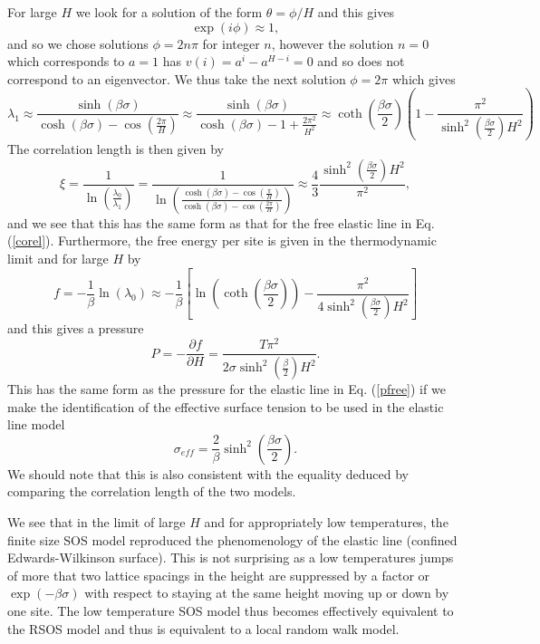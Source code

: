 For large $H$ we look for a solution of the form $\theta=\phi/H$ and this gives
\begin{equation}
\exp(i\phi) \approx  1,
\end{equation}
and so we chose solutions $\phi = 2n\pi$ for integer $n$, however the solution $n=0$ which corresponds to $a=1$ has $v(i) = a^i-a^{H-i} =0$ and so does not correspond to an eigenvector. We thus take the next solution $\phi = 2\pi$ which gives
\begin{equation}
\lambda_1 \approx \frac{\sinh(\beta\sigma)}{\cosh(\beta\sigma) - \cos(\frac{2\pi}{H})} \approx \frac{\sinh(\beta\sigma)}{\cosh(\beta\sigma) - 1+ \frac{2\pi^2}{H^2}}\approx \coth(\frac{\beta\sigma}{2})(1 - \frac{\pi^2}{\sinh^2(\frac{\beta\sigma}{2}) H^2})
\end{equation}
The correlation length is then given by
\begin{equation}
\xi =\frac{1}{\ln(\frac{\lambda_0}{\lambda_1})} = \frac{1}{\ln(\frac{\cosh(\beta\sigma) - \cos(\frac{\pi}{H})}{\cosh(\beta\sigma) - \cos(\frac{2\pi}{H})})}\approx  \frac{4}{3}\frac{\sinh^2(\frac{\beta\sigma}{2})H^2}{\pi^2},
\end{equation}
and we see that this has the same form as that for the free elastic line  in Eq. (\ref{corel}).
Furthermore, the  free energy per site is given in the thermodynamic limit and for large $H$ by
\begin{equation}
f=-\frac{1}{\beta}\ln(\lambda_0) \approx -\frac{1}{\beta}\left[ \ln(\coth(\frac{\beta\sigma}{2}))- \frac{\pi^2}{4\sinh^2(\frac{\beta\sigma}{2}) H^2}\right]
\end{equation}
and this gives a pressure
\begin{equation}
P= -\frac{\partial f}{\partial H}= \frac{T\pi^2}{2\sigma\sinh^2(\frac{\beta}{2}) H^2}.
\end{equation}
This has the same form as the pressure for the elastic line in Eq. (\ref{pfree}) if we make the identification of the effective surface tension to be used in the elastic line model
\begin{equation}
\sigma_{eff} = \frac{2}{\beta}\sinh^2(\frac{\beta\sigma}{2}).
\end{equation}
We should note that this is also consistent with the equality deduced by comparing the correlation length of the two models.

We see that in the limit of large $H$ and for appropriately low temperatures, the finite size SOS model reproduced the phenomenology of the elastic line (confined Edwards-Wilkinson surface). 
This is not surprising as a low temperatures jumps of more that two lattice spacings in the height are suppressed by a factor or $\exp(-\beta\sigma)$ with respect to staying at the same height moving up or down by one site. The low temperature SOS model thus becomes effectively equivalent to the RSOS model and thus is equivalent to a local random walk model. 

